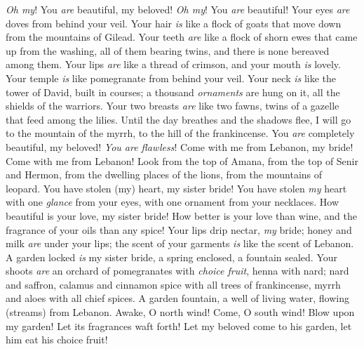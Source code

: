 \begin{biblechapter} %
 \textit{Oh my}! You \textit{are} beautiful, my beloved! 
\textit{Oh my}! You \textit{are} beautiful! 
Your eyes \textit{are} doves 
from behind your veil. 
Your hair \textit{is} like a flock of goats 
that move down from the mountains of Gilead.
\verse Your teeth \textit{are} like a flock of shorn ewes 
that came up from the washing, 
all of them bearing twins, 
and there is none bereaved among them.
\verse Your lips \textit{are} like a thread of crimson, 
and your mouth \textit{is} lovely. 
Your temple \textit{is} like pomegranate 
from behind your veil.
\verse Your neck \textit{is} like the tower of David, 
built in courses; 
a thousand \textit{ornaments} are hung on it, 
all the shields of the warriors.
\verse Your two breasts \textit{are} like two fawns, 
twins of a gazelle that feed among the lilies.
\verse Until the day breathes and the shadows flee, 
I will go to the mountain of the myrrh, 
to the hill of the frankincense.
\verse You \textit{are} completely beautiful, my beloved! 
\textit{You are flawless}!
 Come with me from Lebanon, my bride! 
Come with me from Lebanon! 
Look from the top of Amana, 
from the top of Senir and Hermon, 
from the dwelling places of the lions, 
from the mountains of leopard.
\verse You have stolen (my) heart, my sister bride! 
You have stolen \textit{my} heart with one \textit{glance} from your eyes, 
with one ornament from your necklaces.
\verse How beautiful is your love, my sister bride! 
How better is your love than wine, 
and the fragrance of your oils than any spice!
\verse Your lips drip nectar, \textit{my} bride; 
honey and milk \textit{are} under your lips; 
the scent of your garments \textit{is} like the scent of Lebanon.
 A garden locked \textit{is} my sister bride, 
a spring enclosed, a fountain sealed.
\verse Your shoots \textit{are} an orchard of pomegranates with \textit{choice fruit}, 
henna with nard;
\verse nard and saffron, calamus and cinnamon spice with all trees of frankincense, 
myrrh and aloes with all chief spices.
\verse A garden fountain, a well of living water, 
flowing (streams) from Lebanon.
\verse Awake, O north wind! Come, O south wind! 
Blow upon my garden! Let its fragrances waft forth! 
Let my beloved come to his garden, 
let him eat his choice fruit!
\end{biblechapter}

